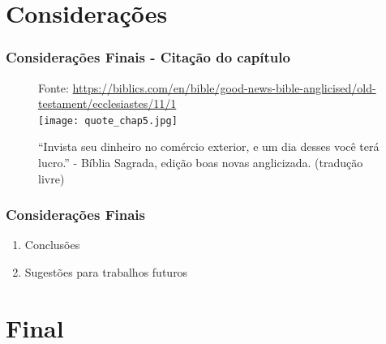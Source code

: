 \documentclass[aspectratio=43,8pt]{beamer}%
\begin{document}

\section{Considerações}

\begin{frame}
	\frametitle{Considerações Finais - Citação do capítulo}
	
	\begin{figure}
		\centering
		{\footnotesize Fonte:  \url{https://biblics.com/en/bible/good-news-bible-anglicised/old-testament/ecclesiastes/11/1}}\\
		\texttt{[image: quote\_chap5.jpg]}
		\caption{``Invista seu dinheiro no comércio exterior, e
			um dia desses você terá lucro.'' - Bíblia Sagrada, edição boas novas anglicizada.
			(tradução livre)}
	\end{figure}
\end{frame}

\begin{frame}
	\frametitle{Considerações Finais}
	\begin{keypoint}
		
		\begin{enumerate}
			\item Conclusões 
			\item Sugestões para trabalhos futuros
		\end{enumerate} 
	\end{keypoint}
\end{frame}

\section{Final}
\end{document}
